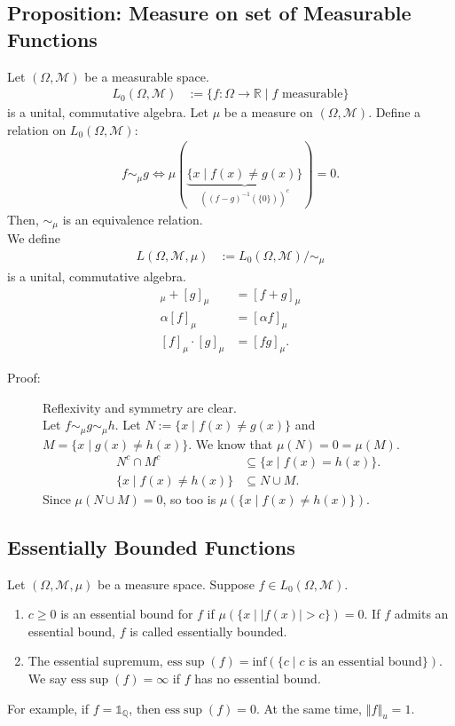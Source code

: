 \documentclass[9pt]{extarticle}
\newcommand{\Q}{\mathbb{Q}}
\newcommand{\R}{\mathbb{R}}
\newcommand{\norm}[1]{\left\Vert #1 \right\Vert}
\newcommand{\esssup}{\text{ess}\sup}
\begin{document}
  \subsection{Proposition: Measure on set of Measurable Functions}%
  Let $(\Omega,\mathcal{M})$ be a measurable space.
  \begin{align*}
    L_0(\Omega,\mathcal{M}) &:= \{f: \Omega \rightarrow \R\mid f\text{ measurable}\}
  \end{align*}
  is a unital, commutative algebra. Let $\mu$ be a measure on $(\Omega,\mathcal{M})$. Define a relation on $L_{0}(\Omega,\mathcal{M})$:
  \begin{align*}
    f\sim_{\mu}g \Leftrightarrow \mu\left(\underbrace{\{x\mid f(x)\neq g(x)\}}_{\left((f-g)^{-1}(\{0\})\right)^{c}}\right) = 0.
  \end{align*}
  Then, $\sim_{\mu}$ is an equivalence relation.\\

  We define
  \begin{align*}
    L(\Omega,\mathcal{M},\mu) &:= L_0(\Omega,\mathcal{M})/\sim_{\mu}
  \end{align*}
  is a unital, commutative algebra.
  \begin{align*}
    [f]_{\mu} + [g]_{\mu} &= [f + g]_{\mu}\\
    \alpha [f]_{\mu} &= [\alpha f]_{\mu}\\
    [f]_{\mu}\cdot[g]_{\mu} &= [fg]_{\mu}.
  \end{align*}
  \begin{description}
    \item[Proof:] Reflexivity and symmetry are clear.\\

      Let $f\sim_{\mu} g \sim_{\mu} h$. Let $N := \{x\mid f(x)\neq g(x)\}$ and $M = \{x\mid g(x)\neq h(x)\}$. We know that $\mu(N) = 0 = \mu(M)$.
      \begin{align*}
        N^{c}\cap M^{c} &\subseteq \{x\mid f(x) = h(x)\}.\\
        \{x\mid f(x)\neq h(x)\} &\subseteq N \cup M.
      \end{align*}
      Since $\mu(N\cup M) = 0$, so too is $\mu\left(\{x\mid f(x)\neq h(x)\}\right)$.
  \end{description}
  \subsection{Essentially Bounded Functions}%
  Let $(\Omega,\mathcal{M},\mu)$ be a measure space. Suppose $f\in L_{0}(\Omega,\mathcal{M})$.
  \begin{enumerate}[(1)]
    \item $c\geq 0$ is an essential bound for $f$ if $\mu\left(\{x\mid |f(x)| > c\}\right) = 0$. If $f$ admits an essential bound, $f$ is called essentially bounded.
    \item The essential supremum, $\esssup(f)= \text{inf}\left(\{c\mid c\text{ is an essential bound}\}\right)$. We say $\esssup(f) = \infty$ if $f$ has no essential bound.
  \end{enumerate}
  For example, if $f = \mathbb{1}_{\Q}$, then $\esssup(f) = 0$. At the same time, $\norm{f}_{u} = 1$.
\end{document}
